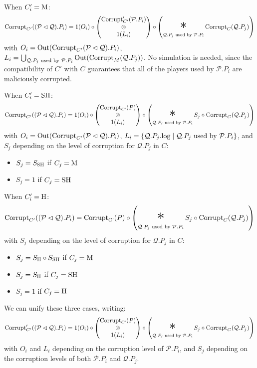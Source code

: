 \begin{theorem}
When $C'_i = \text{M}$:
$$
\tx{Corrupt}_{C'}((\mathcal{P} \lhd \mathcal{Q}).P_i) =
1(O_i) \circ
\begin{pmatrix}
  \tx{Corrupt}'_{C'}(\mathcal{P}.P_i)\cr
  \otimes\cr
  1(L_i)\cr
\end{pmatrix}
\circ
\left(
\bigast_{\mathcal{Q}.P_j \tx{ used by } \mathcal{P}.P_i}
  \tx{Corrupt}_C(\mathcal{Q}.P_j)
\right)
$$
with $O_i = \text{Out}(\text{Corrupt}_{C'}(\mathcal{P} \lhd \mathcal{Q}).P_i)$, $L_i= \bigcup_{\mathcal{Q}.P_j \text{ used by } \mathcal{P}.P_i} \text{Out}(\text{Corrupt}_M(\mathcal{Q}.P_j))$.
No simulation is needed, since the compatibility of $C'$ with $C$
guarantees that all of the players used by $\mathcal{P}.P_i$
are maliciously corrupted.

When $C'_i = \text{SH}$:
$$
\tx{Corrupt}_{C'}((\mathcal{P} \lhd \mathcal{Q}).P_i) =
1(O_i) \circ
\begin{pmatrix}
  \tx{Corrupt}_{\tx{C'}}(P)\cr
  \otimes\cr
  1(L_i)
\end{pmatrix}
\circ
\left(
\bigast_{\mathcal{Q}.P_j \tx{ used by } \mathcal{P}.P_i}
  S_j \circ \tx{Corrupt}_C(\mathcal{Q}.P_j)
\right)
$$
with $O_i = \text{Out}(\text{Corrupt}_{C'}(\mathcal{P} \lhd \mathcal{Q}).P_i)$,
$L_i = \{\mathcal{Q}.P_j.\text{log} \mid \mathcal{Q}.P_j \text{ used by } \mathcal{P}.P_i \}$,
and $S_j$ depending on the level of corruption for $\mathcal{Q}.P_j$ in $C$:
\begin{itemize}
  \item $S_j = S_{\text{SH}}$ if $C_j = \text{M}$
  \item $S_j = 1$ if $C_j = \text{SH}$
\end{itemize}

When $C'_i = \text{H}$:
$$
\tx{Corrupt}_{C'}((\mathcal{P} \lhd \mathcal{Q}).P_i) =
  \tx{Corrupt}_{\tx{C'}}(P)
\circ
\left(
\bigast_{\mathcal{Q}.P_j \tx{ used by } \mathcal{P}.P_i}
  S_j \circ \tx{Corrupt}_C(\mathcal{Q}.P_j)
\right)
$$
with $S_j$ depending on the level of corruption for $\mathcal{Q}.P_j$ in $C$:
\begin{itemize}
  \item $S_j = S_{\text{H}} \circ S_{\text{SH}}$ if $C_j = \text{M}$
  \item $S_j = S_{\text{H}}$ if $C_j = \text{SH}$
  \item $S_j = 1$ if $C_j = \text{H}$
\end{itemize}

We can unify these three cases, writing:
$$
\tx{Corrupt}'_{C'}((\mathcal{P} \lhd \mathcal{Q}).P_i) =
1(O_i) \circ
\begin{pmatrix}
  \tx{Corrupt}_{\tx{C'}}(P)\cr
  \otimes\cr
  1(L_i)
\end{pmatrix}
\circ
\left(
\bigast_{\mathcal{Q}.P_j \tx{ used by } \mathcal{P}.P_i}
  S_j \circ \tx{Corrupt}_C(\mathcal{Q}.P_j)
\right)
$$
with $O_i$ and $L_i$ depending on the corruption level of $\mathcal{P}.P_i$,
and $S_j$ depending on the corruption levels of both $\mathcal{P}.P_i$
and $\mathcal{Q}.P_j$.


\end{theorem}
